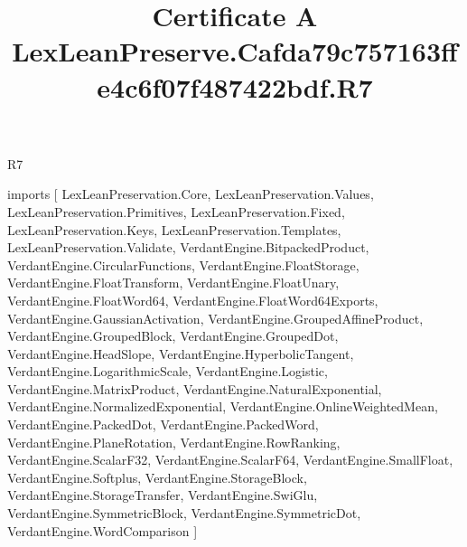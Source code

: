 \begin{lexlean}{R7}
\title{Certificate A LexLeanPreserve.Cafda79c757163ffe4c6f07f487422bdf.R7}
\begin{coremodule}
imports [
  LexLeanPreservation.Core,
  LexLeanPreservation.Values,
  LexLeanPreservation.Primitives,
  LexLeanPreservation.Fixed,
  LexLeanPreservation.Keys,
  LexLeanPreservation.Templates,
  LexLeanPreservation.Validate,
  VerdantEngine.BitpackedProduct,
  VerdantEngine.CircularFunctions,
  VerdantEngine.FloatStorage,
  VerdantEngine.FloatTransform,
  VerdantEngine.FloatUnary,
  VerdantEngine.FloatWord64,
  VerdantEngine.FloatWord64Exports,
  VerdantEngine.GaussianActivation,
  VerdantEngine.GroupedAffineProduct,
  VerdantEngine.GroupedBlock,
  VerdantEngine.GroupedDot,
  VerdantEngine.HeadSlope,
  VerdantEngine.HyperbolicTangent,
  VerdantEngine.LogarithmicScale,
  VerdantEngine.Logistic,
  VerdantEngine.MatrixProduct,
  VerdantEngine.NaturalExponential,
  VerdantEngine.NormalizedExponential,
  VerdantEngine.OnlineWeightedMean,
  VerdantEngine.PackedDot,
  VerdantEngine.PackedWord,
  VerdantEngine.PlaneRotation,
  VerdantEngine.RowRanking,
  VerdantEngine.ScalarF32,
  VerdantEngine.ScalarF64,
  VerdantEngine.SmallFloat,
  VerdantEngine.Softplus,
  VerdantEngine.StorageBlock,
  VerdantEngine.StorageTransfer,
  VerdantEngine.SwiGlu,
  VerdantEngine.SymmetricBlock,
  VerdantEngine.SymmetricDot,
  VerdantEngine.WordComparison
]


\end{coremodule}
\end{lexlean}
